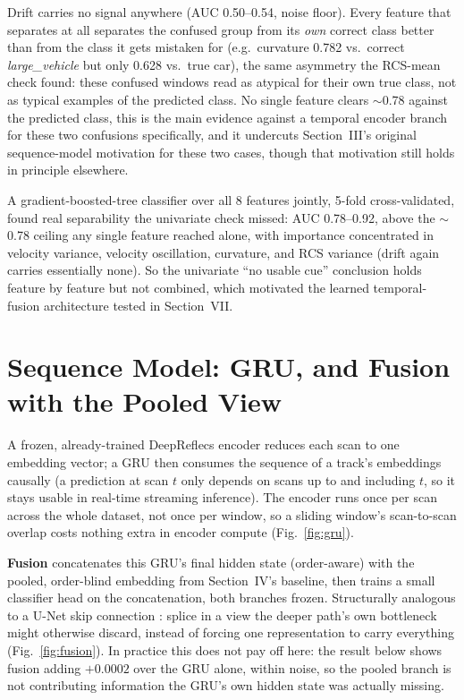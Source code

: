 \documentclass[10pt,letterpaper]{IEEEtran}
\begin{document}
Drift carries no signal anywhere (AUC 0.50--0.54, noise floor). Every feature
that separates at all separates the confused group from its \emph{own}
correct class better than from the class it gets mistaken for (e.g.\
curvature 0.782 vs.\ correct \emph{large\_vehicle} but only 0.628 vs.\ true
car), the same asymmetry the RCS-mean check found: these confused windows
read as atypical for their own true class, not as typical examples of the
predicted class. No single feature clears $\sim$0.78 against the predicted
class, this is the main evidence against a temporal encoder branch for these
two confusions specifically, and it undercuts Section~III's original
sequence-model motivation for these two cases, though that motivation still
holds in principle elsewhere.

A gradient-boosted-tree classifier over all 8 features jointly, 5-fold
cross-validated, found real separability the univariate check missed: AUC
0.78--0.92, above the $\sim$0.78 ceiling any single feature reached alone,
with importance concentrated in velocity variance, velocity oscillation,
curvature, and RCS variance (drift again carries essentially none). So the
univariate ``no usable cue'' conclusion holds feature by feature but not
combined, which motivated the learned temporal-fusion architecture tested in
Section~VII.

\section{Sequence Model: GRU, and Fusion with the Pooled View}

A frozen, already-trained DeepReflecs encoder reduces each scan to one
embedding vector; a GRU then consumes the sequence of a track's embeddings
causally (a prediction at scan $t$ only depends on scans up to and including
$t$, so it stays usable in real-time streaming inference). The encoder runs
once per scan across the whole dataset, not once per window, so a sliding
window's scan-to-scan overlap costs nothing extra in encoder compute
(Fig.~\ref{fig:gru}).

\textbf{Fusion} concatenates this GRU's final hidden state (order-aware) with
the pooled, order-blind embedding from Section~IV's baseline, then trains a
small classifier head on the concatenation, both branches frozen.
Structurally analogous to a U-Net skip connection \cite{ronneberger2015unet}:
splice in a view the deeper path's own bottleneck might otherwise discard,
instead of forcing one representation to carry everything
(Fig.~\ref{fig:fusion}). In practice this does not pay off here: the result
below shows fusion adding $+0.0002$ over the GRU alone, within noise, so the
pooled branch is not contributing information the GRU's own hidden state was
actually missing.
\end{document}
